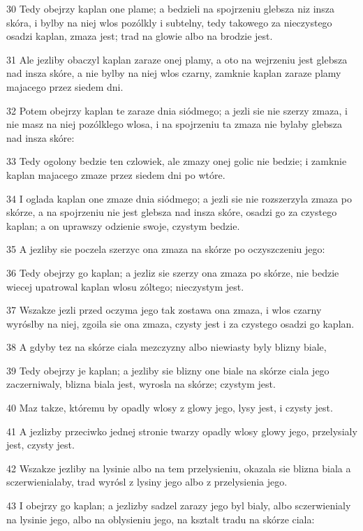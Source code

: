\par 30 Tedy obejrzy kaplan one plame; a bedzieli na spojrzeniu glebsza niz insza skóra, i bylby na niej wlos pozólkly i subtelny, tedy takowego za nieczystego osadzi kaplan, zmaza jest; trad na glowie albo na brodzie jest.
\par 31 Ale jezliby obaczyl kaplan zaraze onej plamy, a oto na wejrzeniu jest glebsza nad insza skóre, a nie bylby na niej wlos czarny, zamknie kaplan zaraze plamy majacego przez siedem dni.
\par 32 Potem obejrzy kaplan te zaraze dnia siódmego; a jezli sie nie szerzy zmaza, i nie masz na niej pozólklego wlosa, i na spojrzeniu ta zmaza nie bylaby glebsza nad insza skóre:
\par 33 Tedy ogolony bedzie ten czlowiek, ale zmazy onej golic nie bedzie; i zamknie kaplan majacego zmaze przez siedem dni po wtóre.
\par 34 I oglada kaplan one zmaze dnia siódmego; a jezli sie nie rozszerzyla zmaza po skórze, a na spojrzeniu nie jest glebsza nad insza skóre, osadzi go za czystego kaplan; a on uprawszy odzienie swoje, czystym bedzie.
\par 35 A jezliby sie poczela szerzyc ona zmaza na skórze po oczyszczeniu jego:
\par 36 Tedy obejrzy go kaplan; a jezliz sie szerzy ona zmaza po skórze, nie bedzie wiecej upatrowal kaplan wlosu zóltego; nieczystym jest.
\par 37 Wszakze jezli przed oczyma jego tak zostawa ona zmaza, i wlos czarny wyróslby na niej, zgoila sie ona zmaza, czysty jest i za czystego osadzi go kaplan.
\par 38 A gdyby tez na skórze ciala mezczyzny albo niewiasty byly blizny biale,
\par 39 Tedy obejrzy je kaplan; a jezliby sie blizny one biale na skórze ciala jego zaczerniwaly, blizna biala jest, wyrosla na skórze; czystym jest.
\par 40 Maz takze, któremu by opadly wlosy z glowy jego, lysy jest, i czysty jest.
\par 41 A jezlizby przeciwko jednej stronie twarzy opadly wlosy glowy jego, przelysialy jest, czysty jest.
\par 42 Wszakze jezliby na lysinie albo na tem przelysieniu, okazala sie blizna biala a sczerwienialaby, trad wyrósl z lysiny jego albo z przelysienia jego.
\par 43 I obejrzy go kaplan; a jezlizby sadzel zarazy jego byl bialy, albo sczerwienialy na lysinie jego, albo na oblysieniu jego, na ksztalt tradu na skórze ciala:
